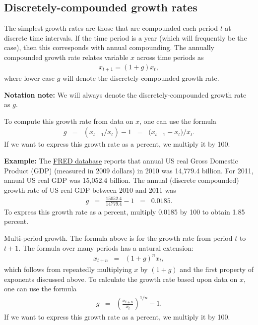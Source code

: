 \subsection*{Discretely-compounded growth rates}

The simplest growth rates are those that are compounded each period $t$ at discrete time intervals. If the time period is a year (which will frequently be the case), then this corresponds with annual compounding. The annually compounded growth rate relates variable $x$ across time periods as
\begin{eqnarray*}
x_{t+1} = (1 + g)x_{t},
\end{eqnarray*}
where lower case $g$ will denote the discretely-compounded growth rate.

\textbf{Notation note:} We will always denote the discretely-compounded growth rate as $g$.


To compute this growth rate from data on $x$, one can use the formula
\begin{eqnarray*}
    g &=& ({x_{t+1}}/{x_t}) - 1 \;\;=\;\; ({x_{t+1}-x_t)}/{x_t}.
\end{eqnarray*}
If we want to express this growth rate as a percent, we multiply it by 100.

\textbf{Example:} The \href{http://research.stlouisfed.org/fred2/series/GDPC1/downloaddata?cid=106}{FRED database} reports that annual US real Gross Domestic Product (GDP) (measured in 2009 dollars) in 2010 was 14,779.4 billion. For 2011, annual US real GDP was 15,052.4 billion. The annual (discrete compounded) growth rate of US real GDP between 2010 and 2011 was
\begin{eqnarray*}
    g &=& \frac{15052.4}{14779.4} - 1 \;\;=\;\; 0.0185.
\end{eqnarray*}
To express this growth rate as a percent, multiply 0.0185 by 100 to obtain 1.85 percent.

Multi-period growth. The formula above is for the growth rate from period $t$ to $t+1$. The formula over many periods has a natural extension:
\begin{eqnarray*}
    x_{t+n} &=& (1 + g)^n x_{t},
\end{eqnarray*}
which follows from repeatedly multiplying $x$ by $(1+g)$ and the first property of exponents discussed above. To calculate the growth rate based upon data on $x$, one can use the formula
\begin{eqnarray*}
    g &=& \left(\frac{x_{t+n}}{x_t}\right)^{{1}/{n}} - 1.
\end{eqnarray*}
If we want to express this growth rate as a percent, we multiply it by 100.

